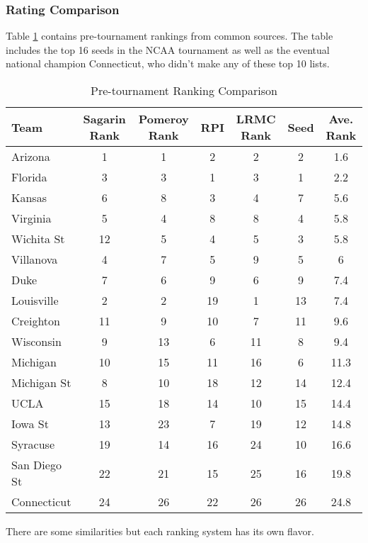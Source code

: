 \subsubsection{Rating Comparison}
Table \ref{tab:ranks} contains pre-tournament rankings from common sources.  The table includes the top 16 seeds in the NCAA tournament as well as the eventual national champion Connecticut, who didn't make any of these top 10 lists.
\begin{table}[h!]
\caption{Pre-tournament Ranking Comparison}
\small
\centering
\begin{tabular}{l|ccccc|c}
  \hline
  \hline
 Team & Sagarin Rank &  Pomeroy Rank & RPI & LRMC Rank & Seed& Ave. Rank  \\ 
  \hline
 Arizona         & 1  &1    & 2     & 2 & 2& 1.6  \\
 Florida          & 3  &3    &1      &3 & 1& 2.2\\
  Kansas         & 6  &8    & 3    & 4& 7 &5.6\\
 Virginia         & 5  &4     &8    &8 & 4 &5.8\\
 Wichita St    & 12 &5      & 4    &5 & 3 &5.8\\
 Villanova      & 4  &7    & 5    & 9 & 5 &6\\
 Duke             & 7  &6     &9     &6 &9&7.4\\
 Louisville      & 2  &2    & 19   & 1 &13 & 7.4\\
  Creighton &  11 &   9 & 10   &7 &11& 9.6\\ 
 Wisconsin  &   9   &13   & 6   &  11 & 8 &9.4\\
 Michigan & 10 & 15& 11& 16& 6 &11.3\\
 Michigan St & 8  &10   & 18 & 12& 14&12.4\\
 UCLA & 15& 18& 14&10 &15 &14.4\\
 Iowa St &13 &23  &7 &19 &12 &14.8 \\
 Syracuse &19 &14  &16 &24 &10 &16.6 \\
 San Diego St&22 &21  &15 &25 &16 &19.8 \\
  \hline
  Connecticut & 24& 26& 22&26& 26&24.8\\
  \hline
   \hline
\end{tabular}
\label{tab:ranks}
\end{table}
There are some similarities but each ranking system has its own flavor.